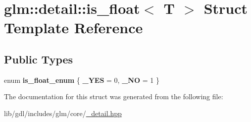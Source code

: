 \hypertarget{structglm_1_1detail_1_1is__float}{}\section{glm\+:\+:detail\+:\+:is\+\_\+float$<$ T $>$ Struct Template Reference}
\label{structglm_1_1detail_1_1is__float}
\subsection*{Public Types}
\begin{DoxyCompactItemize}
\item 
\hypertarget{structglm_1_1detail_1_1is__float_a7001df432147e6d03afa912fb43d3429}{}enum {\bfseries is\+\_\+float\+\_\+enum} \{ {\bfseries \+\_\+\+Y\+E\+S} = 0, 
{\bfseries \+\_\+\+N\+O} = 1
 \}\label{structglm_1_1detail_1_1is__float_a7001df432147e6d03afa912fb43d3429}

\end{DoxyCompactItemize}


The documentation for this struct was generated from the following file\+:\begin{DoxyCompactItemize}
\item 
lib/gdl/includes/glm/core/\hyperlink{__detail_8hpp}{\+\_\+detail.\+hpp}\end{DoxyCompactItemize}
